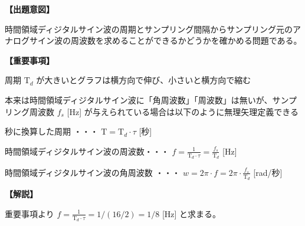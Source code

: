 \noindent \textbf{【出題意図】}

\bigskip
\noindent 時間領域ディジタルサイン波の周期とサンプリング間隔からサンプリング元のアナログサイン波の周波数を求めることができるかどうかを確かめる問題である。

\vspace{1em}
\noindent \textbf{【重要事項】}

\bigskip
\noindent 周期 $\textrm{T}_d$ が大きいとグラフは横方向で伸び、小さいと横方向で縮む

\bigskip
\noindent 本来は時間領域ディジタルサイン波に「角周波数」「周波数」は無いが、サンプリング周波数 $f_s$ [Hz] が与えられている場合は以下のように無理矢理定義できる

\bigskip
\noindent 秒に換算した周期 ・・・ $\textrm{T} = \textrm{T}_d \cdot \tau$ [秒]

\bigskip
\noindent 時間領域ディジタルサイン波の周波数・・・ $f = \frac{1}{\textrm{T}_d\cdot\tau} = \frac{f_s}{\textrm{T}_d}$ [Hz]

\bigskip
\noindent 時間領域ディジタルサイン波の角周波数 ・・・ $w = 2\pi \cdot f = 2 \pi \cdot \frac{f_s}{\textrm{T}_d}$ [rad/秒]

\bigskip

\vspace{1em}
\noindent \textbf{【解説】}

\bigskip
\noindent 重要事項より $f = \frac{1}{\textrm{T}_d\cdot\tau} = 1/(16/2) = 1/8 $ [Hz] と求まる。
